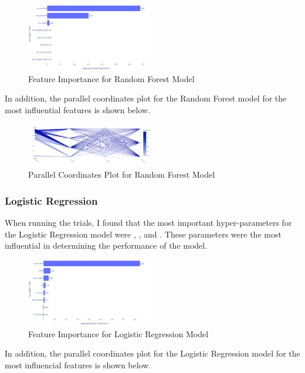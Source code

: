 \documentclass{article}
\begin{document}
\begin{figure}[H]
  \centering
  \includegraphics[width=0.5\textwidth]{img/random_forest_importance.png}
  \caption{Feature Importance for Random Forest Model}
\end{figure}

\noindent In addition, the parallel coordinates plot for the Random Forest model for the most influential features is shown below.

\begin{figure}[H]
  \centering
  \includegraphics[width=0.5\textwidth]{img/tmp.png}
  \caption{Parallel Coordinates Plot for Random Forest Model}
\end{figure}

\subsubsection{Logistic Regression}
When running the trials, I found that the most important hyper-parameters for the Logistic Regression model were , , and . These parameters were the most influential in determining the performance of the model.

\begin{figure}[H]
  \centering
  \includegraphics[width=0.5\textwidth]{img/lr_importance.png}
  \caption{Feature Importance for Logistic Regression Model}
\end{figure}

\noindent In addition, the parallel coordinates plot for the Logistic Regression model for the most influencial features is shown below.
\end{document}
